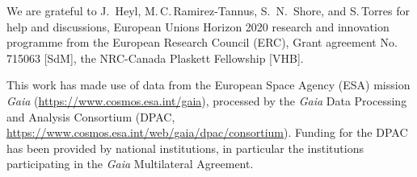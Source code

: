 \documentclass[apjl,twocolumn]{emulateapj}
\begin{document}
  

 \begin{acknowledgements}
   \small
   We are grateful to J.~Heyl, M.\,C.\,Ramirez-Tannus, S.~N.~Shore, and S.\,Torres
   for help and discussions, European Unions Horizon 2020 research and innovation programme from the European Research Council (ERC), Grant agreement No. 715063 [SdM], the NRC-Canada Plaskett Fellowship [VHB].
   
This work has made use of data from the European Space Agency (ESA) mission {\it Gaia} (\url{https://www.cosmos.esa.int/gaia}), processed by the {\it Gaia} Data Processing and Analysis Consortium (DPAC, \url{https://www.cosmos.esa.int/web/gaia/dpac/consortium}). Funding for the DPAC has been provided by national institutions, in particular the institutions
participating in the {\it Gaia} Multilateral Agreement. 
\end{acknowledgements}
\end{document}
